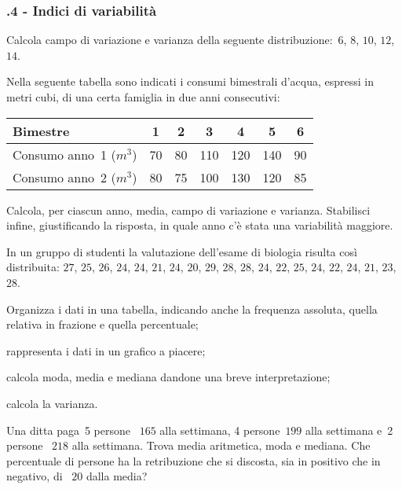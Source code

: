 \subsubsection*{\thechapter.4 - Indici di variabilità}

\begin{esercizio}
\label{ese:A.34}
Calcola campo di variazione e varianza della seguente distribuzione:~$6$, $8$, $10$, $12$, $14$.
\end{esercizio}

\begin{esercizio}
\label{ese:A.35}
Nella seguente tabella sono indicati i consumi bimestrali d'acqua, espressi in metri cubi, di una certa famiglia in due anni consecutivi:
\begin{center}
 \begin{tabular}{l*{6}{c}}
\toprule
Bimestre & 1 & 2 & 3 & 4 & 5 & 6 \\
\midrule
Consumo anno~1 ($\unit{m}^3$) & 70 & 80 & 110 & 120 & 140 & 90 \\
Consumo anno~2 ($\unit{m}^3$) & 80 & 75 & 100 & 130 & 120 & 85 \\
\bottomrule
\end{tabular}
\end{center}
Calcola, per ciascun anno, media, campo di variazione e varianza. Stabilisci infine, giustificando la risposta, in quale anno c'è stata una variabilità maggiore.
\end{esercizio}

\begin{esercizio}
\label{ese:A.36}
In un gruppo di studenti la valutazione dell'esame di biologia risulta così distribuita:
$27$, $25$, $26$, $24$, $24$, $21$, $24$, $20$, $29$, $28$,
$28$, $24$, $22$, $25$, $24$, $22$, $24$, $21$, $23$, $28$.
\begin{enumeratea}
 \item Organizza i dati in una tabella, indicando anche la frequenza assoluta, quella relativa in frazione e quella percentuale;
 \item rappresenta i dati in un grafico a piacere;
 \item calcola moda, media e mediana dandone una breve interpretazione;
 \item calcola la varianza.
\end{enumeratea}
\end{esercizio}

\begin{esercizio}
\label{ese:A.37}
Una ditta paga~5 persone \officialeuro~$165$ alla settimana, 4 persone\officialeuro~$199$ alla settimana e~2 persone \officialeuro~$218$ alla settimana.
Trova media aritmetica, moda e mediana. Che percentuale di persone ha la retribuzione che si discosta,
sia in positivo che in negativo, di \officialeuro~$20$ dalla media?
\end{esercizio}

